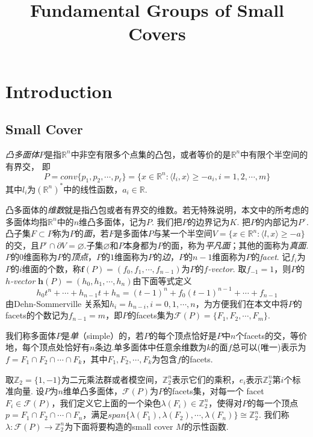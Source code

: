 \documentclass{article}
\title{Fundamental Groups of Small Covers}
\date{}
\theoremstyle{plain}%
\theoremstyle{definition}
\theoremstyle{remark}
\begin{document}
\maketitle
\section{Introduction}
\subsection{Small Cover}
{\em 凸多面体$P$}是指$\mathbb{R}^n$中非空有限多个点集的凸包，或者等价的是$\mathbb{R}^n$中有限个半空间的有界交，
即
$$P=conv\{p_1,p_2,\cdots,p_{\ell}\}=\{x\in \mathbb{R}^n :\langle l_i,x\rangle\geq -a_i,i=1,2,\cdots,m\}$$
其中$l_i$为$(\mathbb{R}^n)^*$中的线性函数，$a_i\in \mathbb{R}$.

凸多面体的{\em 维数}就是指凸包或者有界交的维数。若无特殊说明，本文中的所考虑的多面体均指$\mathbb{R}^n$中的$n$维凸多面体，记为$P$. 我们把$P$的边界记为$K$. 把$P$的内部记为$P^{\circ}$. 凸子集$F\subset P$称为$P$的{\em 面}，若$F$是多面体$P$与某一个半空间$V=\{x\in \mathbb{R}^n :\langle l,x\rangle\geq -a\}$的交，且$P^{\circ}\cap \partial V =\varnothing$.子集$\varnothing$和$P$本身都为$P$的面，称为{\em 平凡面}；其他的面称为{\em 真面}. $P$的$0$维面称为$P$的{\em 顶点}，$P$的$1$维面称为$P$的{\em 边}，$P$的$n-1$维面称为$P$的{\em facet}. 记$f_i$为$P$的$i$维面的个数，称$\mathbf{f}(P)=(f_0,f_1,\cdots,f_{n-1})$为$P$的{\em $f$-vector}. 取$f_{-1}=1$，则$P$的{\em $h$-vector} $\mathbf{h}(P)=(h_0,h_1,\cdots,h_n)$由下面等式定义
$$h_0 t^n+\cdots+h_{n-1}t+h_n=(t-1)^n+f_0(t-1)^{n-1}+\cdots+f_{n-1}$$
由Dehn-Sommerville 关系知$h_i=h_{n-i},i=0,1,\cdots,n$，为方便我们在本文中将$P$的facets的个数记为$f_{n-1}=m$，即$P$的facets集为$\mathcal{F}(P)=\{F_1,F_2,\cdots,F_m\}$.

我们称多面体$P$是{\em 单}（simple）的，若$P$的每个顶点恰好是$P$中$n$个facets的交，等价地，每个顶点处恰好有$n$条边.单多面体中任意余维数为$k$的面$f$总可以(唯一)表示为$f=F_1\cap F_2 \cap \cdots \cap F_k$，其中$F_1,F_2,\cdots,F_k$为包含$f$的facets.


取$\mathbb{Z}_2=\{1,-1\}$为二元乘法群或者模空间，$\mathbb{Z}_2^n$表示它们的乘积，$e_i$表示$\mathbb{Z}_2^n$第$i$个标准向量. 
设$P$为$n$维单凸多面体，$\mathcal{F}(P)$为$P$的facets集，对每一个 facet $F_i\in \mathcal{F}(P)$，我们定义它上面的一个染色$\lambda(F_i)\in \mathbb{Z}_2^n$，使得对$P$的每一个顶点$p=F_1\cap F_2 \cap \cdots \cap F_n$，满足$span\{\lambda(F_1),\lambda(F_2),\cdots,\lambda(F_n)\}\cong \mathbb{Z}_2^n$. 我们称$\lambda:\mathcal{F}(P)\longrightarrow \mathbb{Z}_2^n$为下面将要构造的small cover $M$的示性函数. 
\end{document}
